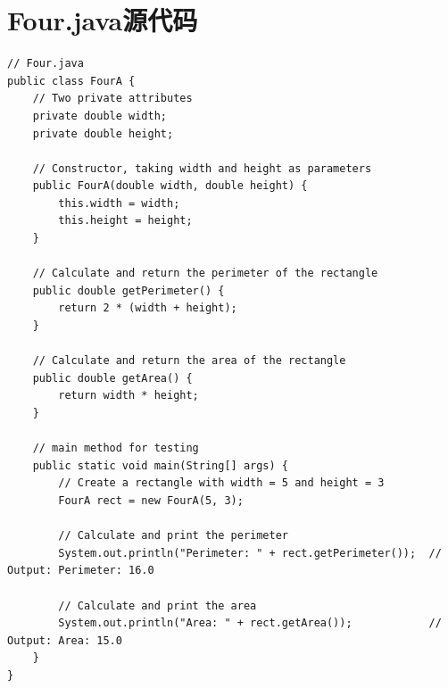 \documentclass[12pt,a4paper]{article}
\begin{document}
\section*{Four.java源代码}\label{sec:four}
\begin{lstlisting}
// Four.java
public class FourA {
    // Two private attributes
    private double width;
    private double height;
    
    // Constructor, taking width and height as parameters
    public FourA(double width, double height) {
        this.width = width;
        this.height = height;
    }
    
    // Calculate and return the perimeter of the rectangle
    public double getPerimeter() {
        return 2 * (width + height);
    }
    
    // Calculate and return the area of the rectangle
    public double getArea() {
        return width * height;
    }
    
    // main method for testing
    public static void main(String[] args) {
        // Create a rectangle with width = 5 and height = 3
        FourA rect = new FourA(5, 3);
        
        // Calculate and print the perimeter
        System.out.println("Perimeter: " + rect.getPerimeter());  // Output: Perimeter: 16.0
        
        // Calculate and print the area
        System.out.println("Area: " + rect.getArea());            // Output: Area: 15.0
    }
}

\end{lstlisting}
\end{document}
